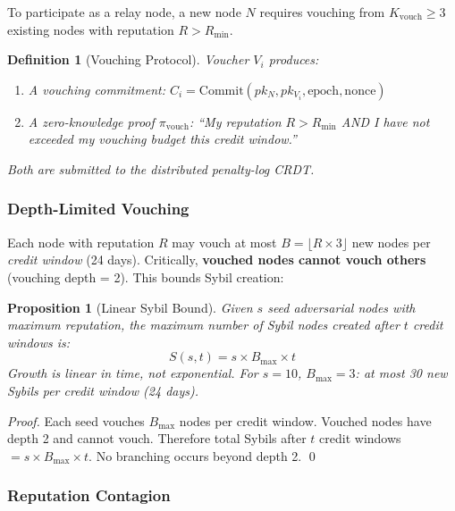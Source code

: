 \documentclass[11pt,a4paper]{article}
\newtheorem{definition}{Definition}
\newtheorem{proposition}[theorem]{Proposition}
\begin{document}
To participate as a relay node, a new node $N$ requires vouching from $K_{\text{vouch}} \geq 3$ existing nodes with reputation $R > R_{\min}$.

\begin{definition}[Vouching Protocol]
Voucher $V_i$ produces:
\begin{enumerate}[nosep]
    \item A vouching commitment: $C_i = \text{Commit}(pk_N, pk_{V_i}, \text{epoch}, \text{nonce})$
    \item A zero-knowledge proof $\pi_{\text{vouch}}$: ``My reputation $R > R_{\min}$ AND I have not exceeded my vouching budget this credit window.''
\end{enumerate}
Both are submitted to the distributed penalty-log CRDT.
\end{definition}

\subsubsection{Depth-Limited Vouching}

Each node with reputation $R$ may vouch at most $B = \lfloor R \times 3 \rfloor$ new nodes per \emph{credit window} (24 days). Critically, \textbf{vouched nodes cannot vouch others} (vouching depth = 2). This bounds Sybil creation:

\begin{proposition}[Linear Sybil Bound]
\label{prop:sybil-bound}
Given $s$ seed adversarial nodes with maximum reputation, the maximum number of Sybil nodes created after $t$ credit windows is:
\begin{equation}
    S(s, t) = s \times B_{\max} \times t
\end{equation}
Growth is linear in time, not exponential. For $s = 10$, $B_{\max} = 3$: at most 30 new Sybils per credit window (24 days).
\end{proposition}

\begin{proof}
Each seed vouches $B_{\max}$ nodes per credit window. Vouched nodes have depth 2 and cannot vouch. Therefore total Sybils after $t$ credit windows $= s \times B_{\max} \times t$. No branching occurs beyond depth 2. \qed
\end{proof}

\subsubsection{Reputation Contagion}
\end{document}
